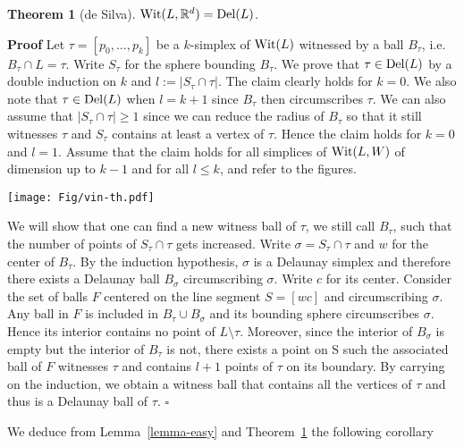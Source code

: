 \documentclass[11pt,a4paper]{article}
\newtheorem{theorem}{Theorem}
\newenvironment{proof}
        {\noindent \textbf{Proof} \hspace{0.3mm}}
        {\hspace{0.3mm}$\square$  \smallskip}
\newcommand{\R}{\mathbb R}
\newcommand{\del}{{\rm Del}}
\newcommand{\wit}{{\rm Wit}}
\begin{document}
\begin{theorem}[de Silva] 
\label{lemma-silva}
$\wit (L, \R^d) = \del (L)$. 
\end{theorem}

\begin{proof}\cite{aem-ww-2007}
Let $\tau=[p_0,...,p_k]$ be a $k$-simplex of $\wit (L)$  witnessed by a ball
$B_{\tau}$, i.e. $B_{\tau}\cap L = \tau$. Write $S_{\tau}$ for the
sphere bounding $B_{\tau}$.
We prove that {$\tau \in \del (L)$} by a double induction on $k$ and
$l := |S_{\tau} \cap \tau |$. The claim clearly holds for $k = 0$. We
also note that $\tau\in \del (L)$ when $l = k + 1$ since $B_{\tau}$
then circumscribes $\tau$. We can also assume that $|S_{\tau} \cap
\tau | \geq 1$ since we can reduce the radius of $B_{\tau}$ so that it
still witnesses $\tau$ and $S_{\tau}$ contains at least a vertex of
$\tau$. Hence the claim holds for $k=0$ and $l=1$.
Assume that the claim holds for all simplices of $\wit (L, W )$ of dimension up to $k-1$ and for all $l \leq k$, and refer to the figures.

\begin{center}
\texttt{[image: Fig/vin-th.pdf]}
\end{center}


We will show that one can find a new witness ball of $\tau$, we still
call $B_{\tau}$, such that the number of points of $S_{\tau}\cap \tau$
gets increased. Write $\sigma = S_{\tau}\cap \tau$ and $w$ for the
center of $B_{\tau}$. By the induction hypothesis, $\sigma$ is a
Delaunay simplex and therefore there exists a Delaunay ball
$B_{\sigma}$ circumscribing $\sigma$. Write $c$ for its
center. Consider the set of balls $F$ centered on the line segment $S
= [wc]$ and circumscribing $\sigma$. Any ball in $F$ is included in
$B_{\tau}\cup B_{\sigma}$ and its bounding sphere circumscribes
$\sigma$. Hence its interior contains no point of $L\setminus
\tau$. Moreover, since the interior of $B_{\sigma}$ is empty but the
interior of $B_{\tau}$ is not, there exists a point on S such the
associated ball of $F$ witnesses $\tau$ and contains $l + 1$ points of
$\tau$ on its boundary. By carrying on the induction, we obtain a
witness ball that contains all the vertices of $\tau$ and thus is a
Delaunay ball of $\tau$.
\end{proof}

We deduce from Lemma~\ref{lemma-easy} and Theorem~\ref{lemma-silva} 
the following corollary
\end{document}
